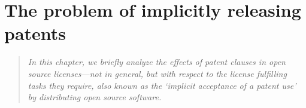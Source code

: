 %
%
%
%
%


\section{The problem of implicitly releasing patents}
\footnotesize \begin{quote}\itshape In this chapter, we briefly analyze
the effects of patent clauses in open source licenses---not in general, but with
respect to the license fulfilling tasks they require, also known as the
`implicit acceptance of a patent use' by distributing open source software.
\end{quote}
\normalsize

